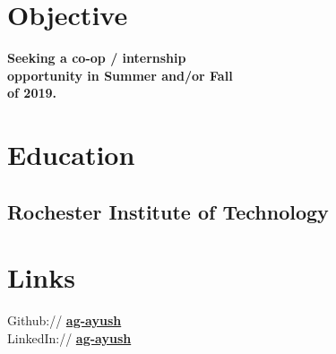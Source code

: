 \documentclass[]{deedy-resume-openfont}
\begin{document}
%
%
\lastupdated

%
%

%
%

\begin{minipage}[t]{0.30\textwidth}


\section{Objective}
\textbf{Seeking a co-op / internship \\
opportunity in Summer and/or Fall \\
of 2019.}


\section{Education}

\subsection{Rochester Institute of Technology }
\sectionsep


\section{Links}
Github:// \href{https://github.com/ayush}{\bf ag-ayush} \\
LinkedIn://  \href{https://www.linkedin.com/in/ag-ayush}{\bf ag-ayush} \\



\end{minipage}
\end{document}
